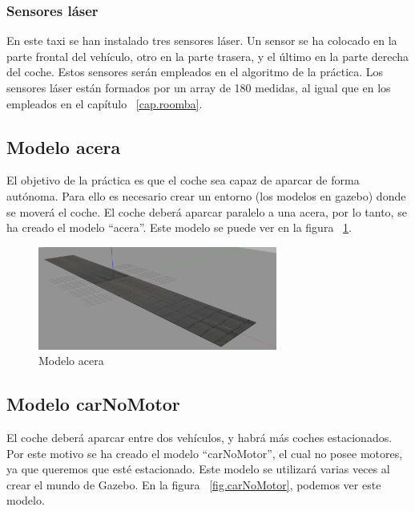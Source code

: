 \subsubsection{Sensores láser}
En este taxi se han instalado tres sensores láser. Un sensor se ha colocado en la parte frontal del vehículo, otro en la parte trasera, y el último en la parte derecha del coche. Estos sensores serán empleados en el algoritmo de la práctica. Los sensores láser están formados por un array de 180 medidas, al igual que en los empleados en el capítulo ~\ref{cap.roomba}. \\


\subsection{Modelo acera} \label{sec.acera}
El objetivo de la práctica es que el coche sea capaz de aparcar de forma autónoma. Para ello es necesario crear un entorno (los modelos en gazebo) donde se moverá el coche. El coche deberá aparcar paralelo a una acera, por lo tanto, se ha creado el modelo ``acera''. Este modelo se puede ver en la figura ~\ref{fig.acera}.

\begin{figure}[H]
  \begin{center}
    \includegraphics[width=0.7\textwidth]{figures/Autopark/acera.png}
		\caption{Modelo acera}
		\label{fig.acera}
		\end{center}
\end{figure}

\subsection{Modelo carNoMotor}
El coche deberá aparcar entre dos vehículos, y habrá más coches estacionados. Por este motivo se ha creado el modelo ``carNoMotor'', el cual no posee motores, ya que queremos que esté estacionado. Este modelo se utilizará varias veces al crear el mundo de Gazebo. En la figura ~\ref{fig.carNoMotor}, podemos ver este modelo.

